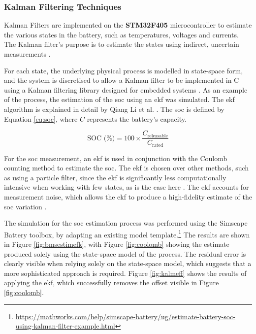 \subsubsection{Kalman Filtering Techniques}
\label{kalm}

Kalman Filters are implemented on the \textbf{STM32F405} microcontroller to estimate the various states in the battery, such as temperatures, voltages and currents. The Kalman filter's purpose is to estimate the states using indirect, uncertain measurements \cite{kalfilt}. 

For each state, the underlying physical process is modelled in state-space form, and the system is discretised to allow a Kalman filter to be implemented in C using a Kalman filtering library designed for embedded systems \cite{computers11110165}. As an example of the process, the estimation of the \gls{soc} using an \gls{ekf} was simulated. The \gls{ekf} algorithm is explained in detail by Qiang Li et al. \cite{kalfilt}.  The \gls{soc} is defined by Equation \ref{eq:soc}, where $C$ represents the battery's capacity.

\begin{equation}
\label{eq:soc}
\text{SOC (\%)} = 100 \times \frac{C_{\text{releasable}}}{C_{\text{rated}}}
\end{equation}

For the \gls{soc} measurement, an \gls{ekf} is used in conjunction with the Coulomb counting method to estimate the \gls{soc}. The \gls{ekf} is chosen over other methods, such as using a particle filter, since the \gls{ekf} is significantly less computationally intensive when working with few states, as is the case here \cite{STELZER20171483}. The \gls{ekf} accounts for measurement noise, which allows the \gls{ekf} to produce a high-fidelity estimate of the \gls{soc} variation \cite{Zaki2025}.

 The simulation for the \gls{soc} estimation process was performed using the Simscape Battery toolbox, by adapting an existing model template.\footnote{\url{https://mathworks.com/help/simscape-battery/ug/estimate-battery-soc-using-kalman-filter-example.html}} The results are shown in Figure \ref{fig:bmsestimefk}, with Figure \ref{fig:coolomb} showing the estimate produced solely using the state-space model of the process. The residual error is clearly visible when relying solely on the state-space model, which suggests that a more sophisticated approach is required. Figure \ref{fig:kalmeff} shows the results of applying the \gls{ekf}, which successfully removes the offset visible in Figure \ref{fig:coolomb}.



